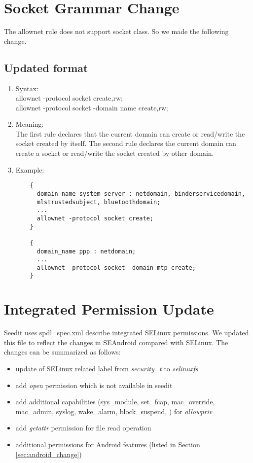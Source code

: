 \documentclass{article}
\begin{document}
\section{Socket Grammar Change}

The allownet rule does not support socket class. So we made the following 
change.

\subsection{Updated format}
\begin{enumerate}
	\item Syntax:\\
	allownet -protocol socket create,rw;\\
	allownet -protocol socket -domain name create,rw;\\
	\item Meaning:\\
	The first rule declares that the current domain can create or read/write 
	the socket created by itself. The second rule declares the current domain 
	can create a socket or read/write the socket created by other domain.
	\item Example:\\
	\begin{verbatim}
	{
	  domain_name system_server : netdomain, binderservicedomain, 
	  mlstrustedsubject, bluetoothdomain;
	  ...
	  allownet -protocol socket create;
	}
	
	{
	  domain_name ppp : netdomain;
	  ...
	  allownet -protocol socket -domain mtp create;
	}
	\end{verbatim}
\end{enumerate}

\section{Integrated Permission Update}
Seedit uses spdl\_spec.xml describe integrated SELinux permissions. We updated 
this file to reflect the changes in SEAndroid compared with SELinux. The 
changes can be summarized as follows:
\begin{itemize}
	\item update of SELinux related label from {\em security\_t} to {\em 
	selinuxfs}
	\item add {\em open} permission which is not available in seedit
	\item add additional capabilities (sys\_module, set\_fcap, mac\_override, 
	mac\_admin, syslog, wake\_alarm, block\_suspend, ) for {\em allowpriv}
	\item add {\em getattr} permission for file read operation
	\item additional permissions for Android features (listed in Section 
	\ref{sec:android_change})

\end{itemize}
\end{document}
